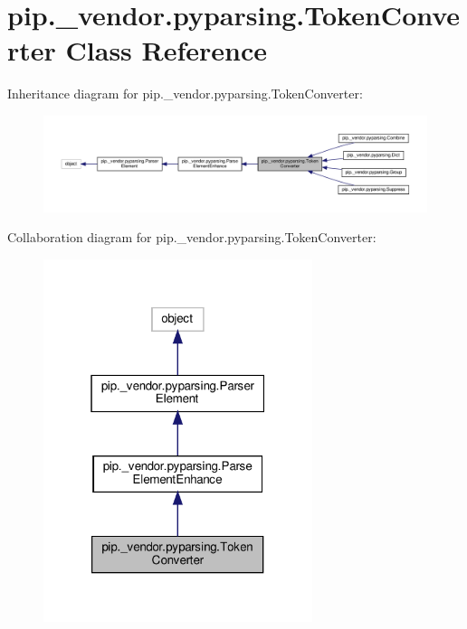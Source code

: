 \hypertarget{classpip_1_1__vendor_1_1pyparsing_1_1TokenConverter}{}\section{pip.\+\_\+vendor.\+pyparsing.\+Token\+Converter Class Reference}
\label{classpip_1_1__vendor_1_1pyparsing_1_1TokenConverter}


Inheritance diagram for pip.\+\_\+vendor.\+pyparsing.\+Token\+Converter\+:
\nopagebreak
\begin{figure}[H]
\begin{center}
\leavevmode
\includegraphics[width=350pt]{classpip_1_1__vendor_1_1pyparsing_1_1TokenConverter__inherit__graph}
\end{center}
\end{figure}


Collaboration diagram for pip.\+\_\+vendor.\+pyparsing.\+Token\+Converter\+:
\nopagebreak
\begin{figure}[H]
\begin{center}
\leavevmode
\includegraphics[width=223pt]{classpip_1_1__vendor_1_1pyparsing_1_1TokenConverter__coll__graph}
\end{center}
\end{figure}
